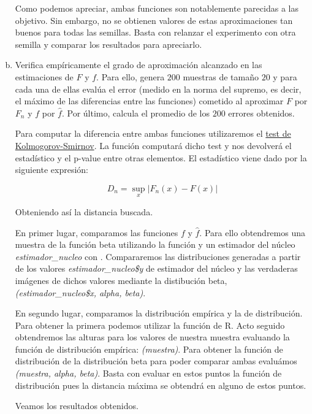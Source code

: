 \documentclass[a4paper]{article}
\begin{document}
\begin{enumerate}[a)]
	Como podemos apreciar, ambas funciones son notablemente parecidas a las objetivo. Sin embargo, no se obtienen valores de estas aproximaciones tan buenos para todas las semillas. Basta con relanzar el experimento con otra semilla y comparar los resultados para apreciarlo.
	
	\item Verifica empíricamente el grado de aproximación alcanzado en las estimaciones de $F$	y $f$. Para ello, genera $200$ muestras de tamaño $20$ y para cada una de ellas evalúa el error (medido en la norma del supremo, es decir, el máximo de las diferencias entre las funciones) cometido al aproximar $F$ por $F_n$ y $f$ por $\hat f$. Por último, calcula el promedio de los $200$ errores obtenidos.
	
	Para computar la diferencia entre ambas funciones utilizaremos el \href{https://en.wikipedia.org/wiki/Kolmogorov%E2%80%93Smirnov_test}{test de Kolmogorov-Smirnov}. La función \KeywordTok{ks.test} computará dicho test y nos devolverá el estadístico y el p-value entre otras elementos. El estadístico viene dado por la siguiente expresión:
		
\[
	D_n = \sup_{x}|F_n(x) - F(x)|
\]
		
	Obteniendo así la distancia buscada.
	
	En primer lugar, comparamos las funciones $f$ y $\hat f$. Para ello obtendremos una muestra de la función beta utilizando la función  y un estimador del núcleo \emph{estimador\_nucleo} con . Compararemos las distribuciones generadas a partir de los valores \emph{estimador\_nucleo\$y} de estimador del núcleo y las verdaderas imágenes de dichos valores mediante la distibución beta, \emph{(estimador\_nucleo\$x, alpha, beta)}.
		
	En segundo lugar, comparamos la distribución empírica y la de distribución. Para obtener la primera podemos utilizar la función  de R. Acto seguido obtendremos las alturas para los valores de nuestra muestra evaluando la función de distribución empírica: \emph{(muestra)}. Para obtener la función de distribución de la distribución beta para poder comparar ambas evaluámos \emph{(muestra, alpha, beta)}. Basta con evaluar en estos puntos la función de distribución pues la distancia máxima se obtendrá en alguno de estos puntos.
	
	Veamos los resultados obtenidos.
		
\begin{Shaded}
\begin{Highlighting}[]
\NormalTok{(}\NormalTok{)}


\end{Highlighting}
\end{Shaded}
\end{enumerate}
\end{document}
